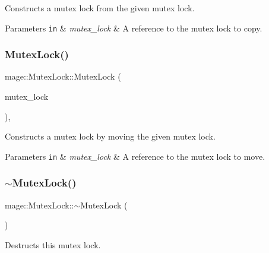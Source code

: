 Constructs a mutex lock from the given mutex lock.


\begin{DoxyParams}[1]{Parameters}
\mbox{\tt in}  & {\em mutex\+\_\+lock} & A reference to the mutex lock to copy. \\
\hline
\end{DoxyParams}
\hypertarget{classmage_1_1_mutex_lock_a38bbba48500fbf6d0c0e6864f3d8aa7f}{}\label{classmage_1_1_mutex_lock_a38bbba48500fbf6d0c0e6864f3d8aa7f} 
\subsubsection{\texorpdfstring{Mutex\+Lock()}{MutexLock()}\hspace{0.1cm}{\footnotesize\ttfamily [3/3]}}
{\footnotesize\ttfamily mage\+::\+Mutex\+Lock\+::\+Mutex\+Lock (\begin{DoxyParamCaption}\item[{\hyperlink{classmage_1_1_mutex_lock}{Mutex\+Lock} \&\&}]{mutex\+\_\+lock }\end{DoxyParamCaption})\hspace{0.3cm}{\ttfamily [default]}, {\ttfamily [noexcept]}}

Constructs a mutex lock by moving the given mutex lock.


\begin{DoxyParams}[1]{Parameters}
\mbox{\tt in}  & {\em mutex\+\_\+lock} & A reference to the mutex lock to move. \\
\hline
\end{DoxyParams}
\hypertarget{classmage_1_1_mutex_lock_a2631e8878646b2d25b136b6adb55d553}{}\label{classmage_1_1_mutex_lock_a2631e8878646b2d25b136b6adb55d553} 
\subsubsection{\texorpdfstring{$\sim$\+Mutex\+Lock()}{~MutexLock()}}
{\footnotesize\ttfamily mage\+::\+Mutex\+Lock\+::$\sim$\+Mutex\+Lock (\begin{DoxyParamCaption}{ }\end{DoxyParamCaption})}

Destructs this mutex lock. 

